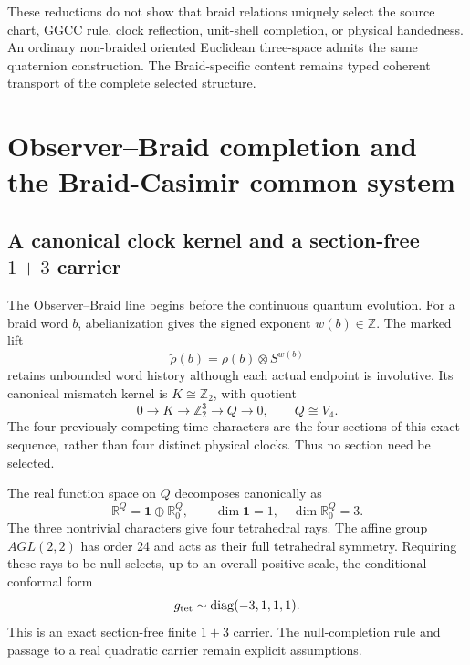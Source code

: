 \documentclass[11pt]{article}
\theoremstyle{definition}
\theoremstyle{remark}
\begin{document}
These reductions do not show that braid relations uniquely select the source chart, GGCC rule, clock reflection, unit-shell completion, or physical handedness. An ordinary non-braided oriented Euclidean three-space admits the same quaternion construction. The Braid-specific content remains typed coherent transport of the complete selected structure.


\section{Observer--Braid completion and the Braid-Casimir common system}

\subsection{A canonical clock kernel and a section-free $1+3$ carrier}

The Observer--Braid line begins before the continuous quantum evolution. For a braid word $b$, abelianization gives the signed exponent $w(b)\in\mathbb Z$. The marked lift
\begin{equation}
 \widetilde\rho(b)=\rho(b)\otimes S^{w(b)}
\end{equation}
retains unbounded word history although each actual endpoint is involutive. Its canonical mismatch kernel is $K\cong\mathbb Z_2$, with quotient
\begin{equation}
 0\longrightarrow K\longrightarrow \mathbb Z_2^3\longrightarrow Q\longrightarrow0,
 \qquad Q\cong V_4.
\end{equation}
The four previously competing time characters are the four sections of this exact sequence, rather than four distinct physical clocks. Thus no section need be selected.

The real function space on $Q$ decomposes canonically as
\begin{equation}
 \mathbb R^Q=\mathbf 1\oplus \mathbb R^Q_0,
 \qquad \dim \mathbf 1=1,\quad \dim\mathbb R^Q_0=3.
\end{equation}
The three nontrivial characters give four tetrahedral rays. The affine group $AGL(2,2)$ has order 24 and acts as their full tetrahedral symmetry. Requiring these rays to be null selects, up to an overall positive scale, the conditional conformal form
\begin{equation}
 g_{\rm tet}\sim\operatorname{diag}(-3,1,1,1).
\end{equation}
This is an exact section-free finite $1+3$ carrier. The null-completion rule and passage to a real quadratic carrier remain explicit assumptions.
\end{document}

